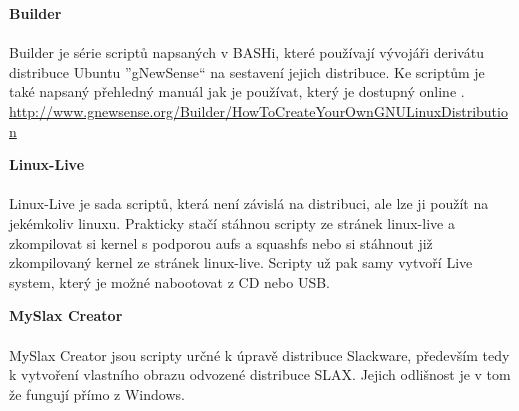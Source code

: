\documentclass[a4paper,12pt]{article}
\newcommand{\nadpis}[1]{%
	\vspace{4 mm}
	\textbf{#1}\\
	\vspace{4 mm}
	}
\begin{document}
\nadpis{Builder}\\
Builder je série scriptů napsaných v BASHi, které používají vývojáři derivátu distribuce Ubuntu ''gNewSense`` na sestavení jejich distribuce. Ke scriptům je také napsaný přehledný manuál jak je používat, který je dostupný online \cite{Linux_Build}.\\ \href{http://www.gnewsense.org/Builder/HowToCreateYourOwnGNULinuxDistribution}{http://www.gnewsense.org/Builder/HowToCreateYourOwnGNULinuxDistribution}

\nadpis{Linux-Live}\\
Linux-Live je sada scriptů, která není závislá na distribuci, ale lze ji použít na jekémkoliv linuxu. Prakticky stačí stáhnou scripty ze stránek linux-live a zkompilovat si kernel s podporou aufs a squashfs nebo si stáhnout již zkompilovaný kernel ze stránek linux-live. Scripty už pak samy vytvoří Live system, který je možné nabootovat z CD nebo USB.

\nadpis{MySlax Creator}\\
MySlax Creator jsou scripty určné k úpravě distribuce Slackware, především tedy k vytvoření vlastního obrazu odvozené distribuce SLAX. Jejich odlišnost je v tom že fungují přímo z Windows.
\end{document}
